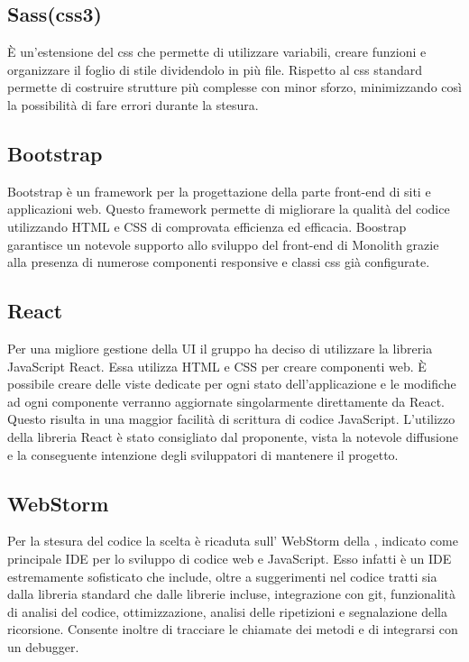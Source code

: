 \subsection{Sass(css3)}
È un'estensione del css che permette di utilizzare variabili, creare funzioni e organizzare il foglio di stile dividendolo in più file. Rispetto al css standard permette di costruire strutture più complesse con minor sforzo, minimizzando così la possibilità di fare errori durante la stesura.

\subsection{Bootstrap}
Bootstrap è un framework per la progettazione della parte front-end di siti e applicazioni web. Questo framework permette di migliorare la qualità del codice utilizzando  HTML e CSS di comprovata efficienza ed efficacia. Boostrap garantisce un notevole supporto allo sviluppo del front-end di Monolith grazie alla presenza di numerose componenti responsive e classi css già configurate.

\subsection{React}
Per una migliore gestione della UI il gruppo ha deciso di utilizzare la libreria JavaScript React. Essa utilizza HTML e CSS per creare componenti web. È possibile creare delle viste dedicate per ogni stato dell’applicazione e le modifiche ad ogni componente verranno aggiornate singolarmente direttamente da React. Questo risulta in una maggior facilità di scrittura di codice JavaScript. L’utilizzo della libreria React è stato consigliato dal proponente, vista la notevole diffusione e la conseguente intenzione degli sviluppatori di mantenere il progetto.

\subsection{WebStorm}
Per la stesura del codice la scelta è ricaduta sull' WebStorm della , indicato come principale IDE per lo sviluppo di codice web e JavaScript. Esso infatti è un IDE estremamente sofisticato che include, oltre a suggerimenti nel codice tratti sia dalla libreria standard che dalle librerie incluse, integrazione con git, funzionalità di analisi del codice, ottimizzazione, analisi delle ripetizioni e segnalazione della ricorsione. Consente inoltre di tracciare le chiamate dei metodi e di integrarsi con un debugger.